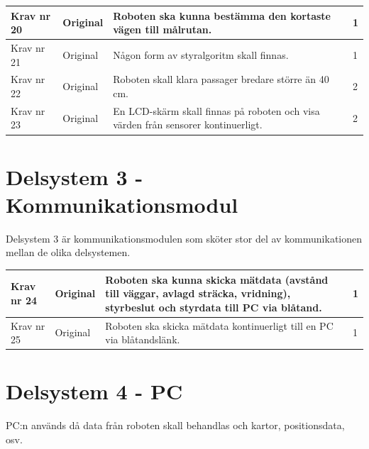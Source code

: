 \documentclass[11pt]{article}
\begin{document}
\begin{flushleft}
\begin{center}
\begin{longtable}{|l|l|p{.70\linewidth}|l|} \hline

Krav nr 20 &
Original &
Roboten ska kunna bestämma den kortaste vägen till målrutan. &
1 \\ \hline

Krav nr 21 &
Original &
Någon form av styralgoritm skall finnas. &
1 \\ \hline

Krav nr 22 &
Original &
Roboten skall klara passager bredare större än 40 cm. &
2 \\ \hline

Krav nr 23 &
Original &
En LCD-skärm skall finnas på roboten och visa värden från sensorer kontinuerligt. &
2 \\ \hline

\end{longtable}
\end{center}


\pagebreak

\section{Delsystem 3 - Kommunikationsmodul}
Delsystem 3 är kommunikationsmodulen som sköter stor del av kommunikationen mellan de olika delsystemen. 
\begin{center}
\begin{longtable}{|l|l|p{.70\linewidth}|l|} \hline

Krav nr 24 &
Original &
Roboten ska kunna skicka mätdata (avstånd till väggar, avlagd sträcka, vridning), styrbeslut och styrdata till PC via blåtand. &
1 \\ \hline

Krav nr 25 &
Original &
Roboten ska skicka mätdata kontinuerligt till en PC via blåtandslänk. &
1 \\ \hline
\end{longtable}
\end{center}

\section{Delsystem 4 - PC}

PC:n används då data från roboten skall behandlas och kartor, positionsdata, osv.

\begin{center}
\begin{longtable}{|l|l|p{.70\linewidth}|l|} \hline


\end{longtable}
\end{center}
\end{flushleft}
\end{document}
